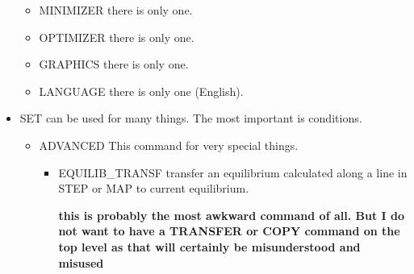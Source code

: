 \documentclass[12pt]{article}
\begin{document}
\begin{itemize}
\begin{itemize}
  \item MINIMIZER there is only one.       
  \item OPTIMIZER there is only one.       
  \item GRAPHICS there is only one.
  \item LANGUAGE there is only one (English).
\end{itemize}
\item SET can be used for many things.  The most important is
  conditions.
  \begin{itemize}
  \item ADVANCED This command for very special things.
    \begin{itemize}
    \item EQUILIB\_TRANSF  transfer an equilibrium calculated along a line
      in STEP or MAP to current equilibrium.

      {\bf this is probably the most awkward command of all.  But I do not
        want to have a TRANSFER or COPY command on the top level as that
        will certainly be misunderstood and misused}


\end{itemize}
\end{itemize}
\end{itemize}
\end{document}
